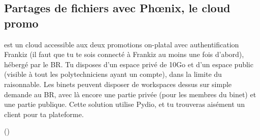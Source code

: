 \subsection{Partages de fichiers avec Phœnix, le cloud promo}
\label{phoenix}
 est un cloud accessible aux deux promotions on-platal avec authentification Frankiz
(il faut que tu te sois connecté à Frankiz au moins une fois d'abord), hébergé par le BR.
Tu disposes d'un espace privé de 10Go et d'un espace public (visible à tout les polytechniciens ayant un compte),
dans la limite du raisonnable. Les binets peuvent disposer de workspaces dessus sur simple demande au BR,
avec là encore une partie privée (pour les membres du binet) et une partie publique.
Cette solution utilise Pydio,
et tu trouveras aisément un client pour ta plateforme.

()
